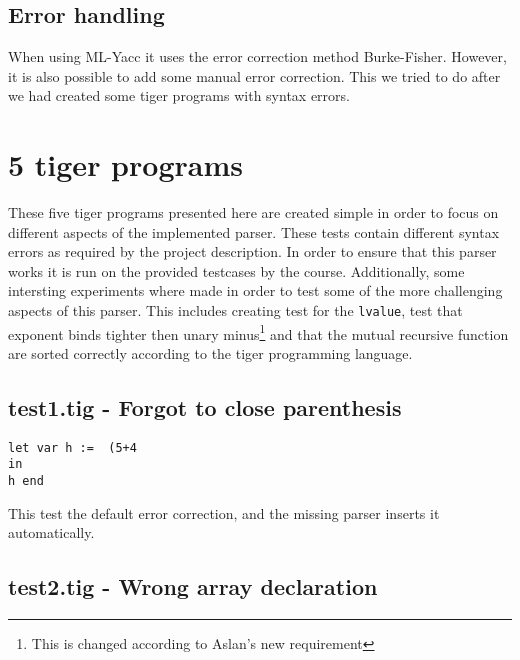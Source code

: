 \documentclass{article}
\begin{document}
\subsection{Error handling}
When using ML-Yacc it uses the error correction method Burke-Fisher. However, it is also possible to add some manual error correction. This we tried to do after we had created some tiger programs with syntax errors.

\section{5 tiger programs}


These five tiger programs presented here are created simple in order to focus on different aspects of the implemented parser. These tests contain different syntax errors as required by the project description. In order to ensure that this parser works it is run on the provided testcases by the course. Additionally, some intersting experiments where made in order to test some of the more challenging aspects of this parser. This includes creating test for the \texttt{lvalue}, test that exponent binds tighter then unary minus\footnote{This is changed according to Aslan's new requirement} and that the mutual recursive function are sorted correctly according to the tiger programming language.

\subsection{test1.tig - Forgot to close parenthesis}
\begin{lstlisting}[frame=single]
let var h :=  (5+4
in
h end
\end{lstlisting}

This test the default error correction, and the missing parser inserts it automatically.


\subsection{test2.tig - Wrong array declaration}
\end{document}
